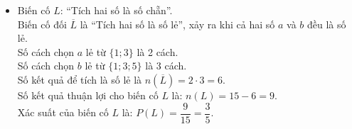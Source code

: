 \begin{bt}
{\begin{enumerate}[a)]
\begin{itemize}
\begin{itemize}
            \item Với $a = 2$: $b \in \{1; 2\}$ (có 2 cặp: $(2; 1), (2; 2)$).
            \item Với $a = 3$: $b \in \{1\}$ (có 1 cặp: $(3; 1)$).
        \end{itemize}
        Số kết quả thuận lợi là $n(M) = 4 + 2 + 1 = 7$.\\
        Xác suất của biến cố $M$ là:
        $P(M) = \dfrac{7}{15}$.
        \item Biến cố $L$: “Tích hai số là số chẵn”.\\
        Biến cố đối $\overline{L}$ là “Tích hai số là số lẻ”, xảy ra khi cả hai số $a$ và $b$ đều là số lẻ.\\
        Số cách chọn $a$ lẻ từ $\{1; 3\}$ là 2 cách.\\
        Số cách chọn $b$ lẻ từ $\{1; 3; 5\}$ là 3 cách.\\
        Số kết quả để tích là số lẻ là $n(\overline{L}) = 2 \cdot 3 = 6$.\\
        Số kết quả thuận lợi cho biến cố $L$ là:
        $n(L) = 15 - 6 = 9$.\\
        Xác suất của biến cố $L$ là:
        $P(L) = \dfrac{9}{15} = \dfrac{3}{5}$.
    \end{itemize}
\end{enumerate}
}
\end{bt}

